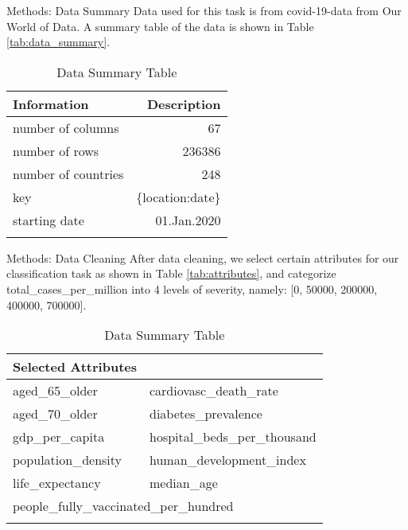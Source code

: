 \begin{frame}{Methods: Data Summary}
Data used for this task is from covid-19-data from Our World of Data. A summary table of the data is shown in Table \autoref{tab:data_summary}.
\begin{table}
	\caption{Data Summary Table}
	\centering
	\begin{tabular}{lr}
		\hline
		\textbf{Information} & \textbf{Description} \\
		\hline
		number of columns & 67 \\
		number of rows & 236386 \\
		number of countries & 248 \\
		key & \{location:date\}\\
		starting date & 01.Jan.2020\\
		\hline
	\label{tab:data_summary}
	\end{tabular}
\end{table}
\end{frame}

\begin{frame}{Methods: Data Cleaning}
After data cleaning, we select certain attributes for our classification task as shown in Table \autoref{tab:attributes}, and categorize total\_cases\_per\_million into 4 levels of severity, namely: [0, 50000, 200000, 400000, 700000].
\\
\begin{table}
	\caption{Data Summary Table}
	\centering
	\begin{tabular}{ll}
		\hline
		\textbf{Selected Attributes} &  \\
		\hline
		aged\_65\_older & cardiovasc\_death\_rate \\
		aged\_70\_older & diabetes\_prevalence \\
		gdp\_per\_capita & hospital\_beds\_per\_thousand \\
		population\_density & human\_development\_index \\
		life\_expectancy & median\_age \\
		\multicolumn{2}{l}{people\_fully\_vaccinated\_per\_hundred} \\
		\hline
	\label{tab:attributes}
	\end{tabular}
\end{table}
\end{frame}

